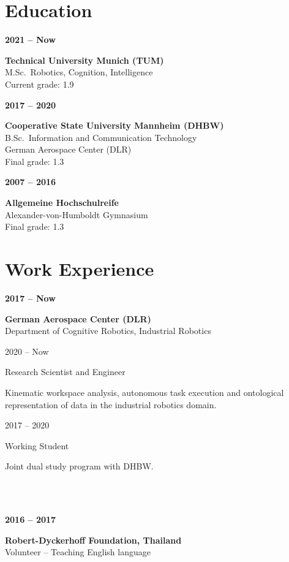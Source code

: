 \documentclass[a4paper, 10pt]{article}
\newcommand{\CVEntry}[3]{
    \begin{minipage}[t]{0.23\textwidth}
        \textbf{#1}
    \end{minipage}%
    \begin{minipage}[t]{0.76\textwidth}
        \textbf{#2}\\
        #3
    \end{minipage}%
}
\newcommand{\CVSubEntry}[2]{
    \begin{minipage}[t]{0.23\textwidth}
        \vspace{3pt}
        \hspace{8pt}#1
    \end{minipage}%
    \begin{minipage}[t]{0.76\textwidth}
        \vspace{3pt}
        #2
    \end{minipage}%
}
\begin{document}
\begin{tcbraster}[raster columns=7]
\begin{tcolorbox}[left=1cm, height=1.0\textheight, colback=white, raster multicolumn=5, boxrule=0pt, frame empty, nobeforeafter]
    \section*{Education}
    \CVEntry{2021 -- Now}{Technical University Munich (TUM)}{
        M.Sc.\ Robotics, Cognition, Intelligence\\
        Current grade: 1.9\\
    }
    \CVEntry{2017 -- 2020}{Cooperative State University Mannheim (DHBW)}{
        B.Sc.\ Information and Communication Technology\\
        German Aerospace Center (DLR)\\
        Final grade: 1.3\\
    }
    \CVEntry{2007 -- 2016}{Allgemeine Hochschulreife}{
        Alexander-von-Humboldt Gymnasium\\
        Final grade: 1.3\\
    }
    \vspace{1.5mm}
    \section*{Work Experience}
    \CVEntry{2017 -- Now}{German Aerospace Center (DLR)}{
        Department of Cognitive Robotics, Industrial Robotics
    }%
    \CVSubEntry{2020 -- Now}{
        Research Scientist and Engineer
        {
            \small\begin{spacing}{0.9}
            Kinematic workspace analysis, autonomous task execution and ontological representation of data in the industrial robotics domain.
            \end{spacing}%
            \vspace{2pt}
        }%
    }%
    \CVSubEntry{2017 -- 2020}{
        Working Student
        {
            \small\begin{spacing}{0.9}
            Joint dual study program with DHBW.
            \end{spacing}%
            \vspace{2pt}
        }
    }\\\\
    \CVEntry{2016 -- 2017}{Robert-Dyckerhoff Foundation, Thailand}{
        Volunteer -- Teaching English language\\
    }
    \vspace{1.5mm}
    \printbibliography[title=Publications]

    \vspace{1.5mm}

\end{tcolorbox}
\end{tcbraster}
\end{document}
